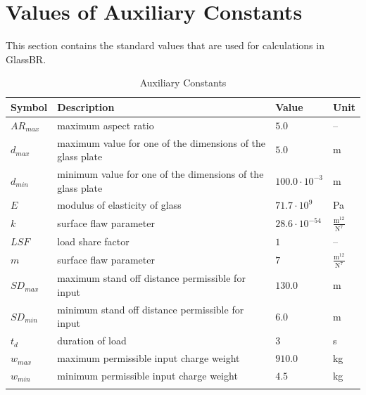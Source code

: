 \documentclass[12pt]{article}
\begin{document}
\section{Values of Auxiliary Constants}
\label{Sec:AuxConstants}
This section contains the standard values that are used for calculations in GlassBR.
\begin{longtabu}{l X[l] l l}
\toprule
Symbol & Description & Value & Unit
\\
\midrule
${AR_{max}}$ & maximum aspect ratio & $5.0$ & --
\\
${d_{max}}$ & maximum value for one of the dimensions of the glass plate & $5.0$ & m
\\
${d_{min}}$ & minimum value for one of the dimensions of the glass plate & $100.0\cdot{}10^{-3}$ & m
\\
$E$ & modulus of elasticity of glass & $71.7\cdot{}10^{9}$ & Pa
\\
$k$ & surface flaw parameter & $28.6\cdot{}10^{-54}$ & $\frac{\text{m}^{12}}{\text{N}^{7}}$
\\
$LSF$ & load share factor & $1$ & --
\\
$m$ & surface flaw parameter & $7$ & $\frac{\text{m}^{12}}{\text{N}^{7}}$
\\
${SD_{max}}$ & maximum stand off distance permissible for input & $130.0$ & m
\\
${SD_{min}}$ & minimum stand off distance permissible for input & $6.0$ & m
\\
${t_{d}}$ & duration of load & $3$ & s
\\
${w_{max}}$ & maximum permissible input charge weight & $910.0$ & kg
\\
${w_{min}}$ & minimum permissible input charge weight & $4.5$ & kg
\\
\bottomrule
\caption{Auxiliary Constants}
\label{Table:TAuxConsts}
\end{longtabu}
\end{document}
